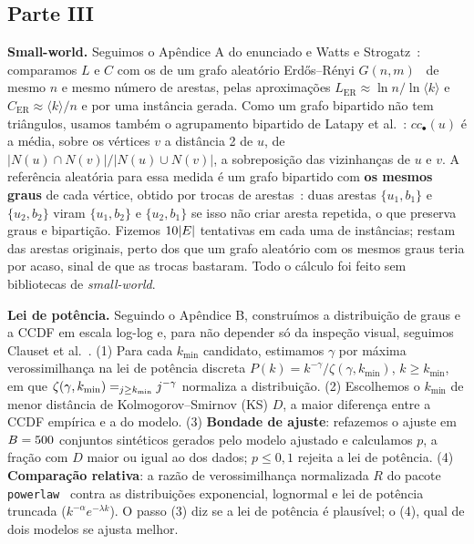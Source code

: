 \documentclass[sigconf]{webmedia}
\let\sum\relax
\begin{document}
\subsection{Parte III}
\textbf{Small-world.} Seguimos o Apêndice A do enunciado e Watts e Strogatz~\cite{watts1998}:
comparamos $L$ e $C$ com os de um grafo aleatório Erd\H{o}s--Rényi $G(n,m)$~\cite{erdos1959} de
mesmo $n$ e mesmo número de arestas, pelas aproximações $L_{\text{ER}}\approx \ln n/\ln\langle
k\rangle$ e $C_{\text{ER}}\approx \langle k\rangle/n$ e por uma instância gerada. Como um grafo
bipartido não tem triângulos, usamos também o agrupamento bipartido de Latapy
et al.~\cite{latapy2008}: $cc_\bullet(u)$ é a média, sobre os vértices $v$ a distância 2 de $u$,
de $|N(u)\cap N(v)|/|N(u)\cup N(v)|$, a sobreposição das vizinhanças de $u$ e $v$. A referência
aleatória para essa medida é um grafo bipartido com \textbf{os mesmos graus} de cada vértice,
obtido por trocas de arestas~\cite{maslov2002,gionis2007}: duas arestas $\{u_1,b_1\}$ e
$\{u_2,b_2\}$ viram $\{u_1,b_2\}$ e $\{u_2,b_1\}$ se isso não criar aresta repetida, o que
preserva graus e bipartição. Fizemos $10|E|$ tentativas em cada uma de \RTrocas{}
instâncias; restam \TrocasRestantesPct{} das arestas originais, perto dos
\TrocasSobreposicaoEsperada{} que um grafo aleatório com os mesmos graus teria por acaso, sinal de
que as trocas bastaram. Todo o cálculo foi feito sem bibliotecas de \textit{small-world}.

\textbf{Lei de potência.} Seguindo o Apêndice B, construímos a distribuição de graus e a CCDF
em escala log-log e, para não depender só da inspeção visual, seguimos Clauset
et al.~\cite{clauset2009}. (1) Para cada $k_{\min}$ candidato, estimamos $\gamma$ por máxima
verossimilhança na lei de potência discreta $P(k)=k^{-\gamma}/\zeta(\gamma,k_{\min})$,
$k\ge k_{\min}$, em que $\zeta(\gamma,k_{\min})=\sum_{j\ge k_{\min}} j^{-\gamma}$ normaliza a
distribuição. (2) Escolhemos o $k_{\min}$ de menor distância de Kolmogorov--Smirnov (KS) $D$, a
maior diferença entre a CCDF empírica e a do modelo. (3) \textbf{Bondade de ajuste}: refazemos o
ajuste em $B=500{}$ conjuntos sintéticos gerados pelo modelo ajustado e calculamos $p$, a fração
com $D$ maior ou igual ao dos dados; $p \le 0{,}1$ rejeita a lei de potência. (4)
\textbf{Comparação relativa}: a razão de verossimilhança normalizada $R$ do pacote
\texttt{powerlaw}~\cite{alstott2014} contra as distribuições exponencial, lognormal e lei de
potência truncada ($k^{-\alpha}e^{-\lambda k}$). O passo (3) diz se a lei de potência é
plausível; o (4), qual de dois modelos se ajusta melhor.
\end{document}
